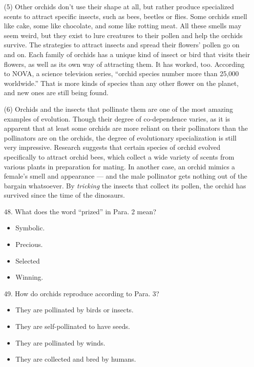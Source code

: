 \documentclass[UTF8,11pt]{ctexart}
\begin{document}
(5) Other orchids don’t use their shape at all, but rather produce specialized scents to attract specific insects, such as bees, beetles or flies. Some orchids smell like cake, some like chocolate, and some like rotting meat. All these smells may seem weird, but they exist to lure creatures to their pollen and help the orchids survive. The strategies to attract insects and spread their flowers’ pollen go on and on. Each family of orchids has a unique kind of insect or bird that visits their flowers, as well as its own way of attracting them. It has worked, too. According to NOVA, a science television series, “orchid species number more than 25,000 worldwide.” That is more kinds of species than any other flower on the planet, and new ones are still being found.


(6) Orchids and the insects that pollinate them are one of the most amazing examples of evolution. Though their degree of co-dependence varies, as it is apparent that at least some orchids are more reliant on their pollinators than the pollinators are on the orchids, the degree of evolutionary specialization is still very impressive. Research suggests that certain species of orchid evolved specifically to attract orchid bees, which collect a wide variety of scents from various plants in preparation for mating. In another case, an orchid mimics a female’s smell and appearance — and the male pollinator gets nothing out of the bargain whatsoever. By \textit{tricking} the insects that collect its pollen, the orchid has survived since the time of the dinosaurs.


48. What does the word “prized” in Para. 2 mean?


\begin{itemize}[leftmargin=2em,itemsep=.2em,topsep=.4em]\item[A.] Symbolic.
\item[B.] Precious.
\item[C.] Selected
\item[D.] Winning.
\end{itemize}

49. How do orchids reproduce according to Para. 3?


\begin{itemize}[leftmargin=2em,itemsep=.2em,topsep=.4em]\item[A.] They are pollinated by birds or insects.
\item[B.] They are self-pollinated to have seeds.
\item[C.] They are pollinated by winds.
\item[D.] They are collected and bred by humans.
\end{itemize}
\end{document}
